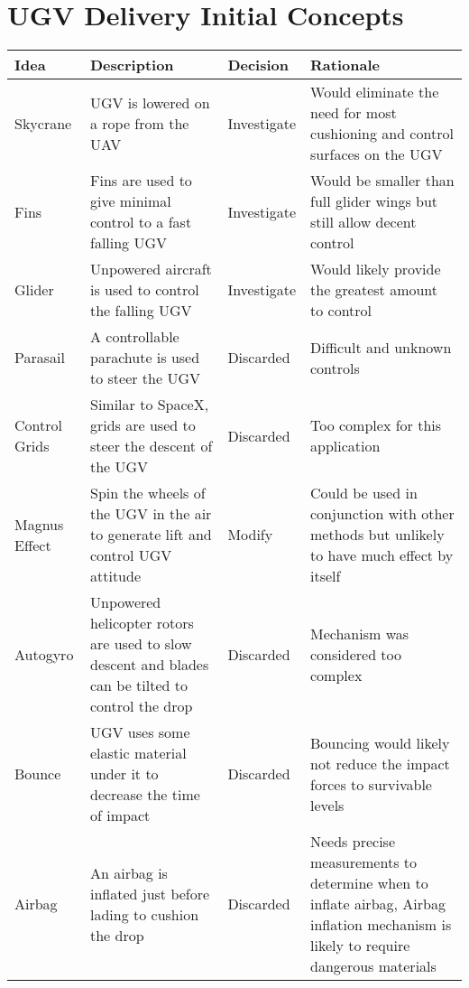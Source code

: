 \documentclass[]{auvsi_doc}
\begin{document}
\section{UGV Delivery Initial Concepts}
\begin{center}
\begin{longtable}[H]{|p{}|p{}|p{}|p{}|}
\hline
\rowcolor[HTML]{C0C0C0}
\textbf{Idea}	&	\textbf{Description}	&	\textbf{Decision} &	\textbf{Rationale} \\
\hline
Skycrane & UGV is lowered on a rope from the UAV & Investigate & Would eliminate the need for most cushioning and control surfaces on the UGV\\
\hline
Fins & Fins are used to give minimal control to a fast falling UGV & Investigate & Would be smaller than full glider wings but still allow decent control\\
\hline
Glider & Unpowered aircraft is used to control the falling UGV & Investigate & Would likely provide the greatest amount to control\\
\hline
Parasail & A controllable parachute is used to steer the UGV & Discarded & Difficult and unknown controls \\
\hline
Control Grids & Similar to SpaceX, grids are used to steer the descent of the UGV & Discarded & Too complex for this application \\
\hline
Magnus Effect & Spin the wheels of the UGV in the air to generate lift and control UGV attitude & Modify & Could be used in conjunction with other methods but unlikely to have much effect by itself\\
\hline
Autogyro & Unpowered helicopter rotors are used to slow descent and blades can be tilted to control the drop & Discarded & Mechanism was considered too complex \\
\hline
Bounce & UGV uses some elastic material under it to decrease the time of impact & Discarded & Bouncing would likely not reduce the impact forces to survivable levels \\
\hline
Airbag & An airbag is inflated just before lading to cushion the drop & Discarded & Needs precise measurements to determine when to inflate airbag, Airbag inflation mechanism is likely to require dangerous materials\\

\end{longtable}
\end{center}
\end{document}

